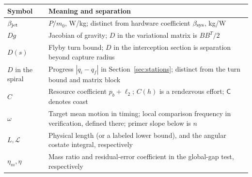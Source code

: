 \begin{center}\small
\begin{tabular}{@{}p{}p{}@{}}
\toprule Symbol&Meaning and separation\\\midrule
$\beta_{\rm jet}$&$P/m_0$, W/kg; distinct from hardware coefficient $\beta_{\rm sys}$, kg/W\\
$Dg$&Jacobian of gravity; $D$ in the variational matrix is $BB^T/2$\\
$D(s)$&Flyby turn bound; $D$ in the interception section is separation beyond capture radius\\
$D$ in the spiral&Progress $|q_i-q_f|$ in Section~\ref{sec:stations}; distinct from the turn bound and matrix block\\
$C$&Resource coefficient $p_b+\ell_2$; $C(h)$ is a rendezvous effort; $\mathsf C$ denotes coast\\
$\omega$&Target mean motion in timing; local comparison frequency in verification, defined there; primer slope below is $n$\\
$L,\mathcal L$&Physical length (or a labeled lower bound), and the angular costate integral, respectively\\
$\eta_m,\eta$&Mass ratio and residual-error coefficient in the global-gap test, respectively\\
\bottomrule
\end{tabular}\end{center}

